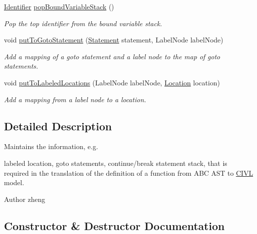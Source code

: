 \begin{DoxyCompactItemize}
\hyperlink{interfaceedu_1_1udel_1_1cis_1_1vsl_1_1civl_1_1model_1_1IF_1_1Identifier}{Identifier} \hyperlink{classedu_1_1udel_1_1cis_1_1vsl_1_1civl_1_1model_1_1common_1_1FunctionInfo_a9372adfb41e6bbdc415ee20ce813da4f}{pop\+Bound\+Variable\+Stack} ()
\begin{DoxyCompactList}\small\item\em Pop the top identifier from the bound variable stack. \end{DoxyCompactList}\item 
void \hyperlink{classedu_1_1udel_1_1cis_1_1vsl_1_1civl_1_1model_1_1common_1_1FunctionInfo_adad18a517a0f8c42f932d8a384391148}{put\+To\+Goto\+Statement} (\hyperlink{interfaceedu_1_1udel_1_1cis_1_1vsl_1_1civl_1_1model_1_1IF_1_1statement_1_1Statement}{Statement} statement, Label\+Node label\+Node)
\begin{DoxyCompactList}\small\item\em Add a mapping of a goto statement and a label node to the map of goto statements. \end{DoxyCompactList}\item 
void \hyperlink{classedu_1_1udel_1_1cis_1_1vsl_1_1civl_1_1model_1_1common_1_1FunctionInfo_a6af95a0efa12d1ae0223e016996dc72d}{put\+To\+Labeled\+Locations} (Label\+Node label\+Node, \hyperlink{interfaceedu_1_1udel_1_1cis_1_1vsl_1_1civl_1_1model_1_1IF_1_1location_1_1Location}{Location} location)
\begin{DoxyCompactList}\small\item\em Add a mapping from a label node to a location. \end{DoxyCompactList}\end{DoxyCompactItemize}


\subsection{Detailed Description}
Maintains the information, e.\+g. 

labeled location, goto statements, continue/break statement stack, that is required in the translation of the definition of a function from A\+B\+C A\+S\+T to \hyperlink{classedu_1_1udel_1_1cis_1_1vsl_1_1civl_1_1CIVL}{C\+I\+V\+L} model.

\begin{DoxyAuthor}{Author}
zheng 
\end{DoxyAuthor}


\subsection{Constructor \& Destructor Documentation}
\hypertarget{classedu_1_1udel_1_1cis_1_1vsl_1_1civl_1_1model_1_1common_1_1FunctionInfo_a351632b7601e7545c51df87c51386f56}{}
